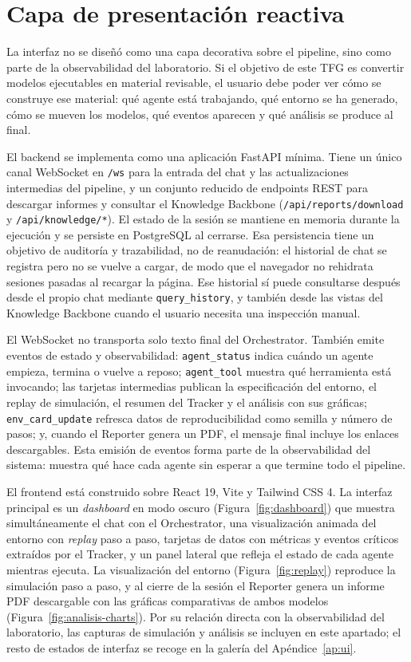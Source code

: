 \section{Capa de presentación reactiva}

La interfaz no se diseñó como una capa decorativa sobre el pipeline, sino
como parte de la observabilidad del laboratorio. Si el objetivo de este TFG
es convertir modelos ejecutables en material revisable, el usuario debe
poder ver cómo se construye ese material: qué agente está trabajando, qué
entorno se ha generado, cómo se mueven los modelos, qué eventos aparecen y
qué análisis se produce al final.

El backend se implementa como una aplicación FastAPI mínima. Tiene un
único canal WebSocket en \texttt{/ws} para la entrada del chat y las
actualizaciones intermedias del pipeline, y un conjunto reducido
de endpoints REST para descargar informes y consultar el Knowledge
Backbone (\texttt{/api/reports/download} y \texttt{/api/knowledge/*}). El
estado de la sesión se mantiene en memoria durante la ejecución y se
persiste en PostgreSQL al cerrarse. Esa persistencia tiene un objetivo
de auditoría y trazabilidad, no de reanudación: el historial de chat se
registra pero no se vuelve a cargar, de modo que el navegador no rehidrata
sesiones pasadas al recargar la página. Ese historial sí puede consultarse
después desde el propio chat mediante \texttt{query\_history}, y también
desde las vistas del Knowledge Backbone cuando el usuario necesita una
inspección manual.

El WebSocket no transporta solo texto final del Orchestrator. También emite
eventos de estado y observabilidad: \texttt{agent\_status} indica cuándo un
agente empieza, termina o vuelve a reposo; \texttt{agent\_tool} muestra qué
herramienta está invocando; las tarjetas intermedias publican la
especificación del entorno, el replay de simulación, el resumen del Tracker
y el análisis con sus gráficas; \texttt{env\_card\_update} refresca datos de
reproducibilidad como semilla y número de pasos; y, cuando el Reporter
genera un PDF, el mensaje final incluye los enlaces descargables. Esta
emisión de eventos forma parte de la observabilidad del sistema: muestra qué
hace cada agente sin esperar a que termine todo el pipeline.

El frontend está construido sobre React 19, Vite y Tailwind CSS 4. La
interfaz principal es un \textit{dashboard} en modo oscuro
(Figura~\ref{fig:dashboard}) que muestra simultáneamente el chat con el
Orchestrator, una visualización animada del entorno con \textit{replay}
paso a paso, tarjetas de datos con métricas y eventos críticos extraídos
por el Tracker, y un panel lateral que refleja el estado de cada agente
mientras ejecuta. La visualización del entorno (Figura~\ref{fig:replay})
reproduce la simulación paso a paso, y al cierre de la sesión el Reporter
genera un informe PDF descargable con las gráficas comparativas de ambos
modelos (Figura~\ref{fig:analisis-charts}). Por su relación directa con la
observabilidad del laboratorio, las capturas de simulación y análisis se
incluyen en este apartado; el resto de estados de interfaz se recoge en la
galería del Apéndice~\ref{ap:ui}.

